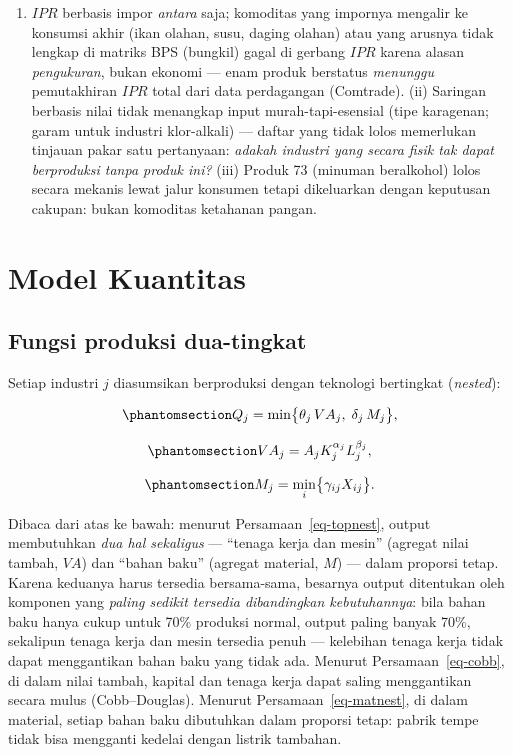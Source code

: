 \documentclass[
  manuscript=article,
  layout=publish,
  year=2026,
  volume=1,
]{den}
\providecommand{\tightlist}{%
  \setlength{\itemsep}{0pt}\setlength{\parskip}{0pt}}
\begin{document}
\begin{enumerate}
\def\labelenumi{(\roman{enumi})}
\tightlist
\item
  \(IPR\) berbasis impor \emph{antara} saja; komoditas yang impornya
  mengalir ke konsumsi akhir (ikan olahan, susu, daging olahan) atau
  yang arusnya tidak lengkap di matriks BPS (bungkil) gagal di gerbang
  \(IPR\) karena alasan \emph{pengukuran}, bukan ekonomi --- enam produk
  berstatus \emph{menunggu} pemutakhiran \(IPR\) total dari data
  perdagangan (Comtrade). (ii) Saringan berbasis nilai tidak menangkap
  input murah-tapi-esensial (tipe karagenan; garam untuk industri
  klor-alkali) --- daftar yang tidak lolos memerlukan tinjauan pakar
  satu pertanyaan: \emph{adakah industri yang secara fisik tak dapat
  berproduksi tanpa produk ini?} (iii) Produk 73 (minuman beralkohol)
  lolos secara mekanis lewat jalur konsumen tetapi dikeluarkan dengan
  keputusan cakupan: bukan komoditas ketahanan pangan.
\end{enumerate}

\section{Model Kuantitas}\label{model-kuantitas}

\subsection{Fungsi produksi dua-tingkat}\label{sec-prodfn}

Setiap industri \(j\) diasumsikan berproduksi dengan teknologi
bertingkat (\emph{nested}):

\begin{equation}\phantomsection\label{eq-topnest}{
Q_j = \min\bigl\{\theta_j \, VA_j,\; \delta_j \, M_j\bigr\},
}\end{equation}

\begin{equation}\phantomsection\label{eq-cobb}{
VA_j = A_j K_j^{\alpha_j} L_j^{\beta_j},
}\end{equation}

\begin{equation}\phantomsection\label{eq-matnest}{
M_j = \min_i \bigl\{\gamma_{ij} X_{ij}\bigr\}.
}\end{equation}

Dibaca dari atas ke bawah: menurut Persamaan~\ref{eq-topnest}, output
membutuhkan \emph{dua hal sekaligus} --- ``tenaga kerja dan mesin''
(agregat nilai tambah, \(VA\)) dan ``bahan baku'' (agregat material,
\(M\)) --- dalam proporsi tetap. Karena keduanya harus tersedia
bersama-sama, besarnya output ditentukan oleh komponen yang \emph{paling
sedikit tersedia dibandingkan kebutuhannya}: bila bahan baku hanya cukup
untuk 70\% produksi normal, output paling banyak 70\%, sekalipun tenaga
kerja dan mesin tersedia penuh --- kelebihan tenaga kerja tidak dapat
menggantikan bahan baku yang tidak ada. Menurut Persamaan~\ref{eq-cobb},
di dalam nilai tambah, kapital dan tenaga kerja dapat saling
menggantikan secara mulus (Cobb--Douglas). Menurut
Persamaan~\ref{eq-matnest}, di dalam material, setiap bahan baku
dibutuhkan dalam proporsi tetap: pabrik tempe tidak bisa mengganti
kedelai dengan listrik tambahan.
\end{document}
